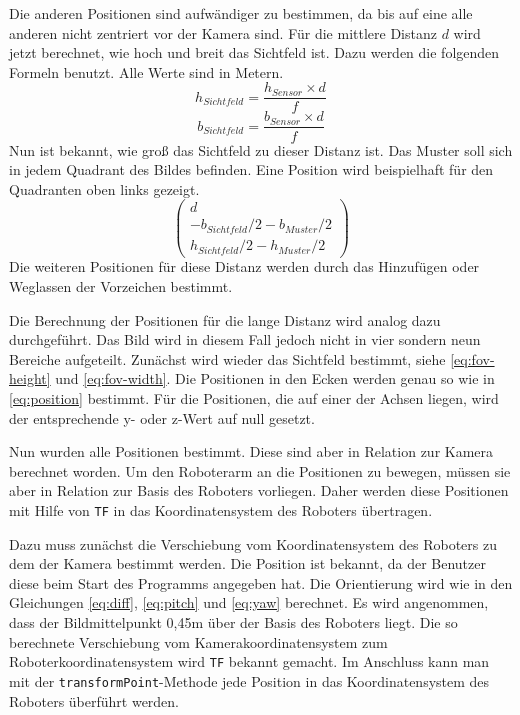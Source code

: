 Die anderen Positionen sind aufwändiger zu bestimmen, da bis auf eine alle anderen nicht zentriert vor der Kamera sind. Für die mittlere Distanz $d$ wird jetzt berechnet, wie hoch und breit das Sichtfeld ist. Dazu werden die folgenden Formeln benutzt. Alle Werte sind in Metern.
\begin{equation}\label{eq:fov-height}
	h_{Sichtfeld} = \frac{h_{Sensor} \times d}{f}
\end{equation}
\begin{equation}\label{eq:fov-width}
	b_{Sichtfeld} = \frac{b_{Sensor} \times d}{f}
\end{equation}
Nun ist bekannt, wie groß das Sichtfeld zu dieser Distanz ist. Das Muster soll sich in jedem Quadrant des Bildes befinden. Eine Position wird beispielhaft für den Quadranten oben links gezeigt.
\begin{equation}\label{eq:position}
	\begin{pmatrix}
		d\\
		-b_{Sichtfeld} / 2 - b_{Muster} / 2\\
		h_{Sichtfeld} / 2 - h_{Muster} / 2
	\end{pmatrix}
\end{equation}
Die weiteren Positionen für diese Distanz werden durch das Hinzufügen oder Weglassen der Vorzeichen bestimmt.

Die Berechnung der Positionen für die lange Distanz wird analog dazu durchgeführt. Das Bild wird in diesem Fall jedoch nicht in vier sondern neun Bereiche aufgeteilt. Zunächst wird wieder das Sichtfeld bestimmt, siehe \autoref{eq:fov-height} und \autoref{eq:fov-width}. Die Positionen in den Ecken werden genau so wie in \autoref{eq:position} bestimmt. Für die Positionen, die auf einer der Achsen liegen, wird der entsprechende y- oder z-Wert auf null gesetzt.


Nun wurden alle Positionen bestimmt. Diese sind aber in Relation zur Kamera berechnet worden. Um den Roboterarm an die Positionen zu bewegen, müssen sie aber in Relation zur Basis des Roboters vorliegen. Daher werden diese Positionen mit Hilfe von \texttt{TF} in das Koordinatensystem des Roboters übertragen.

Dazu muss zunächst die Verschiebung vom Koordinatensystem des Roboters zu dem der Kamera bestimmt werden. Die Position ist bekannt, da der Benutzer diese beim Start des Programms angegeben hat. Die Orientierung wird wie in den Gleichungen \autoref{eq:diff}, \autoref{eq:pitch} und \autoref{eq:yaw} berechnet. Es wird angenommen, dass der Bildmittelpunkt 0,45m über der Basis des Roboters liegt. Die so berechnete Verschiebung vom Kamerakoordinatensystem zum Roboterkoordinatensystem wird \texttt{TF} bekannt gemacht. Im Anschluss kann man mit der \texttt{transformPoint}-Methode jede Position in das Koordinatensystem des Roboters überführt werden.

